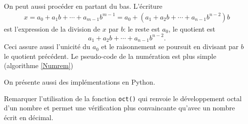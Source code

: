 On peut aussi procéder en partant du bas. L'écriture
\begin{align*}
 x= a_0 + a_1 b +\cdots +a_{m-1}b^{m-1} = a_0 +(a_1+a_2b+\cdots+a_{n-1}b^{n-2})b
\end{align*}
est l'expression de la division de $x$ par $b$: le reste est $a_0$, le quotient est 
\begin{displaymath}
a_1+a_2b+\cdots+a_{n-1}b^{n-2}. 
\end{displaymath}
Ceci assure aussi l'unicité du $a_0$ et le raisonnement se poursuit en divisant par $b$ le quotient précédent. Le pseudo-code de la numération est plus simple (algorithme \ref{Numrem})

On présente aussi des implémentations en Python.




Remarquer l'utilisation de la fonction \texttt{oct()} qui renvoie le développement octal d'un nombre et permet une vérification plus convaincante qu'avec un nombre écrit en décimal.
\printindex

 
